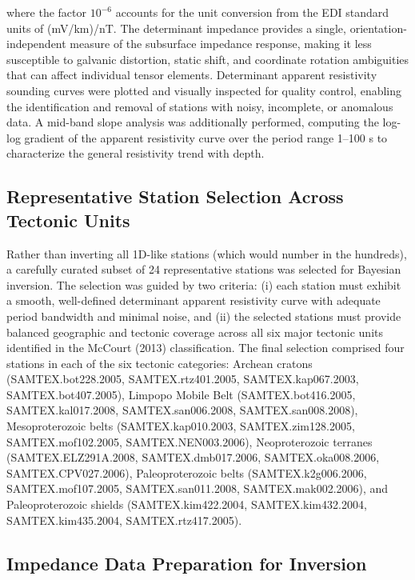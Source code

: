 \noindent where the factor $10^{-6}$ accounts for the unit conversion from the EDI standard units of (mV/km)/nT. The determinant impedance provides a single, orientation-independent measure of the subsurface impedance response, making it less susceptible to galvanic distortion, static shift, and coordinate rotation ambiguities that can affect individual tensor elements. Determinant apparent resistivity sounding curves were plotted and visually inspected for quality control, enabling the identification and removal of stations with noisy, incomplete, or anomalous data. A mid-band slope analysis was additionally performed, computing the log-log gradient of the apparent resistivity curve over the period range 1--100 s to characterize the general resistivity trend with depth.

\subsection*{Representative Station Selection Across Tectonic Units}

Rather than inverting all 1D-like stations (which would number in the hundreds), a carefully curated subset of 24 representative stations was selected for Bayesian inversion. The selection was guided by two criteria: (i) each station must exhibit a smooth, well-defined determinant apparent resistivity curve with adequate period bandwidth and minimal noise, and (ii) the selected stations must provide balanced geographic and tectonic coverage across all six major tectonic units identified in the McCourt (2013) classification. The final selection comprised four stations in each of the six tectonic categories: Archean cratons (SAMTEX.bot228.2005, SAMTEX.rtz401.2005, SAMTEX.kap067.2003, SAMTEX.bot407.2005), Limpopo Mobile Belt (SAMTEX.bot416.2005, SAMTEX.kal017.2008, SAMTEX.san006.2008, SAMTEX.san008.2008), Mesoproterozoic belts (SAMTEX.kap010.2003, SAMTEX.zim128.2005, SAMTEX.mof102.2005, SAMTEX.NEN003.2006), Neoproterozoic terranes (SAMTEX.ELZ291A.2008, SAMTEX.dmb017.2006, SAMTEX.oka008.2006, SAMTEX.CPV027.2006), Paleoproterozoic belts (SAMTEX.k2g006.2006, SAMTEX.mof107.2005, SAMTEX.san011.2008, SAMTEX.mak002.2006), and Paleoproterozoic shields (SAMTEX.kim422.2004, SAMTEX.kim432.2004, SAMTEX.kim435.2004, SAMTEX.rtz417.2005).

\subsection*{Impedance Data Preparation for Inversion}

